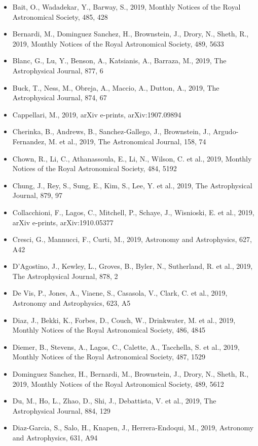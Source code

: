 \documentclass{letter}
\begin{document}
\begin{enumerate}
\begin{itemize}
\item Bait, O., Wadadekar, Y., Barway, S., 2019, Monthly Notices of the Royal Astronomical Society, 485, 428
\item Bernardi, M., Dominguez Sanchez, H., Brownstein, J., Drory, N., Sheth, R., 2019, Monthly Notices of the Royal Astronomical Society, 489, 5633
\item Blanc, G., Lu, Y., Benson, A., Katsianis, A., Barraza, M., 2019, The Astrophysical Journal, 877, 6
\item Buck, T., Ness, M., Obreja, A., Maccio, A., Dutton, A., 2019, The Astrophysical Journal, 874, 67
\item Cappellari, M., 2019, arXiv e-prints, arXiv:1907.09894
\item Cherinka, B., Andrews, B., Sanchez-Gallego, J., Brownstein, J., Argudo-Fernandez, M. et al., 2019, The Astronomical Journal, 158, 74
\item Chown, R., Li, C., Athanassoula, E., Li, N., Wilson, C. et al., 2019, Monthly Notices of the Royal Astronomical Society, 484, 5192
\item Chung, J., Rey, S., Sung, E., Kim, S., Lee, Y. et al., 2019, The Astrophysical Journal, 879, 97
\item Collacchioni, F., Lagos, C., Mitchell, P., Schaye, J., Wisnioski, E. et al., 2019, arXiv e-prints, arXiv:1910.05377
\item Cresci, G., Mannucci, F., Curti, M., 2019, Astronomy and Astrophysics, 627, A42
\item D'Agostino, J., Kewley, L., Groves, B., Byler, N., Sutherland, R. et al., 2019, The Astrophysical Journal, 878, 2
\item De Vis, P., Jones, A., Viaene, S., Casasola, V., Clark, C. et al., 2019, Astronomy and Astrophysics, 623, A5
\item Diaz, J., Bekki, K., Forbes, D., Couch, W., Drinkwater, M. et al., 2019, Monthly Notices of the Royal Astronomical Society, 486, 4845
\item Diemer, B., Stevens, A., Lagos, C., Calette, A., Tacchella, S. et al., 2019, Monthly Notices of the Royal Astronomical Society, 487, 1529
\item Dominguez Sanchez, H., Bernardi, M., Brownstein, J., Drory, N., Sheth, R., 2019, Monthly Notices of the Royal Astronomical Society, 489, 5612
\item Du, M., Ho, L., Zhao, D., Shi, J., Debattista, V. et al., 2019, The Astrophysical Journal, 884, 129
\item Diaz-Garcia, S., Salo, H., Knapen, J., Herrera-Endoqui, M., 2019, Astronomy and Astrophysics, 631, A94

\end{itemize}
\end{enumerate}
\end{document}

